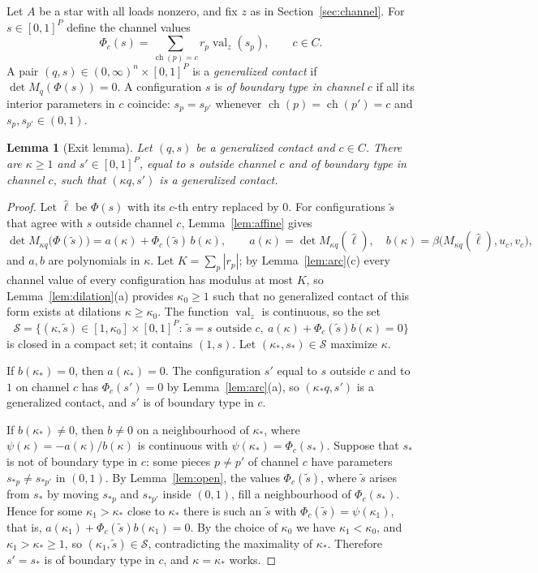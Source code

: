 \documentclass[11pt,a4paper]{article}
\theoremstyle{plain}
\newtheorem{lemma}[theorem]{Lemma}
\theoremstyle{definition}
\theoremstyle{remark}
\newcommand{\val}{\operatorname{val}}
\newcommand{\ch}{\operatorname{ch}}
\begin{document}
Let $A$ be a star with all loads nonzero, and fix $z$ as in Section~\ref{sec:channel}. For
$s\in[0,1]^P$ define the channel values
\[
  \Phi_c(s)=\sum_{\ch(p)=c}r_p\val_z(s_p),\qquad c\in C .
\]
A pair $(q,s)\in(0,\infty)^n\times[0,1]^P$ is a \emph{generalized contact} if
$\det M_q(\Phi(s))=0$. A configuration $s$ is \emph{of boundary type in channel} $c$ if all
its interior parameters in $c$ coincide: $s_p=s_{p'}$ whenever $\ch(p)=\ch(p')=c$ and
$s_p,s_{p'}\in(0,1)$.

\begin{lemma}[Exit lemma]\label{lem:exit}
Let $(q,s)$ be a generalized contact and $c\in C$. There are $\kappa\ge1$ and
$s'\in[0,1]^P$, equal to $s$ outside channel $c$ and of boundary type in channel $c$, such
that $(\kappa q,s')$ is a generalized contact.
\end{lemma}

\begin{proof}
Let $\hat\ell$ be $\Phi(s)$ with its $c$-th entry replaced by $0$. For configurations
$\tilde s$ that agree with $s$ outside channel $c$, Lemma~\ref{lem:affine} gives
\[
  \det M_{\kappa q}\bigl(\Phi(\tilde s)\bigr)=a(\kappa)+\Phi_c(\tilde s)\,b(\kappa),\qquad
  a(\kappa)=\det M_{\kappa q}(\hat\ell),\quad
  b(\kappa)=\beta\bigl(M_{\kappa q}(\hat\ell),u_c,v_c\bigr),
\]
and $a,b$ are polynomials in $\kappa$. Let $K=\sum_p|r_p|$; by Lemma~\ref{lem:arc}(c)
every channel value of every configuration has modulus at most $K$, so
Lemma~\ref{lem:dilation}(a) provides $\kappa_0\ge1$ such that no generalized contact of this form
exists at dilations $\kappa\ge\kappa_0$. The function $\val_z$ is continuous, so the set
\[
  \mathcal S=\bigl\{(\kappa,\tilde s)\in[1,\kappa_0]\times[0,1]^P:\ \tilde s=s\text{ outside }c,\
  a(\kappa)+\Phi_c(\tilde s)b(\kappa)=0\bigr\}
\]
is closed in a compact set; it contains $(1,s)$. Let $(\kappa_*,s_*)\in\mathcal S$ maximize
$\kappa$.

If $b(\kappa_*)=0$, then $a(\kappa_*)=0$. The configuration $s'$ equal to $s$ outside $c$
and to $1$ on channel $c$ has $\Phi_c(s')=0$ by Lemma~\ref{lem:arc}(a), so
$(\kappa_*q,s')$ is a generalized contact, and $s'$ is of boundary type in $c$.

If $b(\kappa_*)\ne0$, then $b\ne0$ on a neighbourhood of $\kappa_*$, where
$\psi(\kappa)=-a(\kappa)/b(\kappa)$ is continuous with $\psi(\kappa_*)=\Phi_c(s_*)$. Suppose that
$s_*$ is not of boundary type in $c$: some pieces $p\ne p'$ of channel $c$ have parameters
$s_{*p}\ne s_{*p'}$ in $(0,1)$. By Lemma~\ref{lem:open}, the values $\Phi_c(\tilde s)$, where
$\tilde s$ arises from $s_*$ by moving $s_{*p}$ and $s_{*p'}$ inside $(0,1)$, fill a
neighbourhood of $\Phi_c(s_*)$. Hence for some $\kappa_1>\kappa_*$ close to $\kappa_*$ there
is such an $\tilde s$ with $\Phi_c(\tilde s)=\psi(\kappa_1)$, that is,
$a(\kappa_1)+\Phi_c(\tilde s)b(\kappa_1)=0$. By the choice of $\kappa_0$ we have
$\kappa_1<\kappa_0$, and $\kappa_1>\kappa_*\ge1$, so $(\kappa_1,\tilde s)\in\mathcal S$,
contradicting the maximality of $\kappa_*$. Therefore $s'=s_*$ is of boundary type in $c$,
and $\kappa=\kappa_*$ works.
\end{proof}
\end{document}
